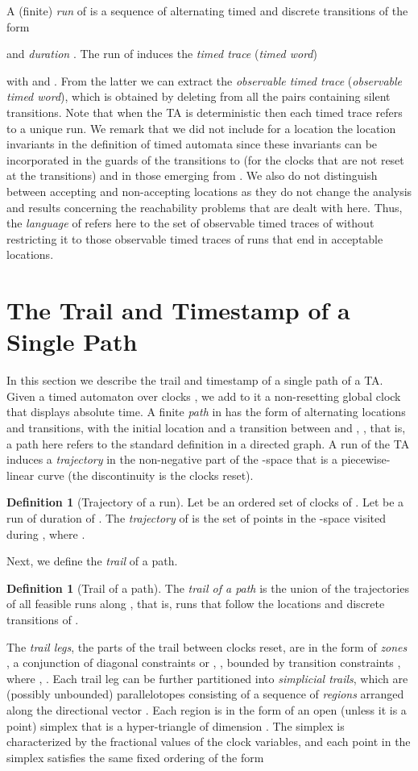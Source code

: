 \documentclass[11pt]{amsart}
\theoremstyle{definition}
\newtheorem{definition}[theorem]{Definition}
\begin{document}
A (finite) \emph{run}  of  is a sequence of alternating timed and discrete transitions of the form 

and \emph{duration} .
The run  of  induces the \emph{timed trace} (\emph{timed word})

with  and . 
From the latter we can extract the \emph{observable timed trace} (\emph{observable timed word}), which is obtained by deleting from  all the pairs containing silent transitions.
Note that when the TA is deterministic then each timed trace refers to a unique run.
We remark that we did not include for a location  the location invariants in the definition of timed automata since these invariants can be incorporated in the guards of the transitions to  (for the clocks that are not reset at the transitions) and in those emerging from .
We also do not distinguish between accepting and non-accepting locations as they do not change the analysis and results concerning the reachability problems that are dealt with here.
Thus, the \emph{language}  of  refers here to the set of observable timed traces of  without restricting it to those observable timed traces of runs that end in acceptable locations.
\section{The Trail and Timestamp of a Single Path}
\label{sec:sing_path}
In this section we describe the trail and timestamp of a single path of a TA.
Given a timed automaton  over  clocks , we add to it a non-resetting global clock  that displays absolute time.
A finite \emph{path} in  has the form  of alternating locations and transitions, with  the initial location and  a transition between  and , , that is, a path here refers to the standard definition in a directed graph.
A run of the TA induces a \emph{trajectory} in the non-negative part of the -space that is a piecewise-linear curve (the discontinuity is the clocks reset).
\begin{definition}[Trajectory of a run]
	Let  be an ordered set of clocks of . 
	Let  be a run of duration  of .
	The \emph{trajectory} of  is the set of points  in the -space visited during , where .
\end{definition}
Next, we define the \emph{trail} of a path.
\begin{definition}[Trail of a path]
	The \emph{trail of a path} 
is the union of the trajectories of all feasible runs along , that is, runs that follow the locations and discrete transitions of .
\end{definition}
The \emph{trail legs}, the parts of the trail between clocks reset, are in the form of \emph{zones} \cite{zones}, a conjunction of diagonal constraints  or , , bounded by transition constraints , where , .
Each trail leg can be further partitioned into \emph{simplicial trails}, which are (possibly unbounded) parallelotopes consisting of a sequence of \emph{regions} \cite{ta} arranged along the directional vector .
Each region  is in the form of an open (unless it is a point) simplex  that is a hyper-triangle of dimension .
The simplex  is characterized by the fractional values  of the clock variables, and each point in the simplex satisfies the same fixed ordering of the form
 
\end{document}

